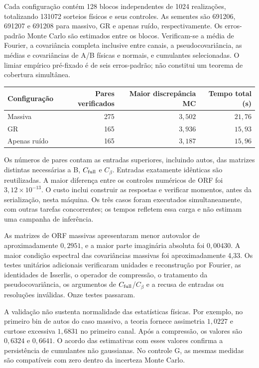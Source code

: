 Cada configuração contém 128 blocos independentes de 1024 realizações,
totalizando 131072 sorteios físicos e seus controles. As sementes são
691206, 691207 e 691208 para massivo, GR e apenas ruído,
respectivamente. Os erros-padrão Monte Carlo são estimados entre os
blocos. Verificam-se a média de Fourier, a covariância completa inclusive
entre canais, a pseudocovariância, as médias e covariâncias de A/B físicas
e normais, e cumulantes selecionadas. O limiar empírico pré-fixado é de
seis erros-padrão; não constitui um teorema de cobertura simultânea.

\begin{center}
\begingroup\small\singlespacing
\begin{tabular}{@{}lrrr@{}}
\toprule
Configuração & Pares verificados & Maior discrepância MC & Tempo total (s)\\
\midrule
Massiva & 275 & \(3{,}502\) & \(21{,}76\)\\
GR & 165 & \(3{,}936\) & \(15{,}93\)\\
Apenas ruído & 165 & \(3{,}187\) & \(15{,}96\)\\
\bottomrule
\end{tabular}
\endgroup
\end{center}
Os números de pares contam as entradas superiores, incluindo autos,
das matrizes distintas necessárias a B, \(C_{\rm full}\) e
\(C_\beta\). Entradas exatamente idênticas são reutilizadas. A maior
diferença entre os controles numéricos de ORF foi
\(3{,}12\times10^{-13}\). O custo inclui construir as respostas e
verificar momentos, antes da serialização, nesta máquina. Os três casos
foram executados simultaneamente, com outras tarefas concorrentes; os
tempos refletem essa carga e não estimam uma campanha de inferência.

As matrizes de ORF massivas apresentaram menor autovalor de
aproximadamente \(0{,}2951\), e a maior parte imaginária absoluta foi
\(0{,}00430\). A maior condição espectral das covariâncias massivas
foi aproximadamente 4,33. Os testes unitários adicionais verificaram
unidades e reconstrução por Fourier, as identidades de Isserlis, o
operador de compressão, o tratamento da pseudocovariância, os argumentos
de \(C_{\rm full}\)/\(C_\beta\) e a recusa de entradas ou
resoluções inválidas. Onze testes passaram.

A validação não sustenta normalidade das estatísticas físicas. Por
exemplo, no primeiro bin de autos do caso massivo, a teoria fornece
assimetria \(1{,}0227\) e curtose excessiva \(1{,}6831\) no primeiro
canal. Após a compressão, os valores são \(0{,}6324\) e
\(0{,}6641\). O acordo das estimativas com esses valores confirma a
persistência de cumulantes não gaussianas. No controle G, as mesmas
medidas são compatíveis com zero dentro da incerteza Monte Carlo.

